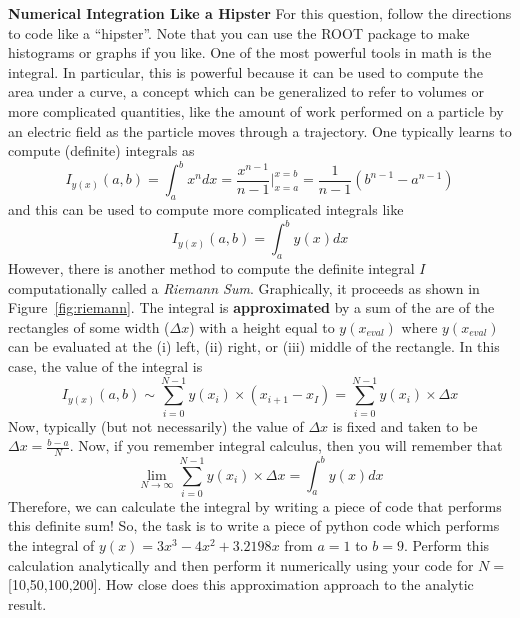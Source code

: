 \documentclass[12pt]{article}
\begin{document}
\newpage
\textbf{Numerical Integration Like a Hipster} 
\newline
For this question, follow the directions to code like a ``hipster''.  Note that you can use the ROOT package to make histograms or graphs if you like.
\newline
\newline
One of the most powerful tools in math is the integral.  In particular, this is powerful because it can be used to compute the area under a curve, a concept which can be generalized to refer to volumes or more complicated quantities, like the amount of work performed on a particle by an electric field as the particle moves through a trajectory.  One typically learns to compute (definite) integrals as
\begin{displaymath}
I_{y(x)}(a,b)=\displaystyle\int_{a}^{b} x^n dx = \frac{x^{n-1}}{n-1}|_{x=a}^{x=b} =  \frac{1}{n-1}(b^{n-1}-a^{n-1})
\end{displaymath}
and this can be used to compute more complicated integrals like
\begin{displaymath}
I_{y(x)}(a,b)=\displaystyle\int_{a}^{b} y(x) dx 
\end{displaymath}
However, there is another method to compute the definite integral $I$ computationally called a \textit{Riemann Sum}.  Graphically, it proceeds as shown in Figure~\ref{fig:riemann}.  The integral is \textbf{approximated} by a sum of the are of the rectangles of some width ($\Delta x$) with a height equal to $y(x_{eval})$ where $y(x_{eval})$ can be evaluated at the (i) left, (ii) right, or (iii) middle of the rectangle.  In this case, the value of the integral is
\begin{displaymath}
I_{y(x)}(a,b)\sim \displaystyle\sum_{i=0}^{N-1} y(x_{i})\times(x_{i+1}-x_{I})=\displaystyle\sum_{i=0}^{N-1} y(x_{i})\times\Delta x
\end{displaymath}
Now, typically (but not necessarily) the value of $\Delta x$ is fixed and taken to be $\Delta x=\frac{b-a}{N}$.  Now, if you remember integral calculus, then you will remember that
\begin{displaymath}
 \displaystyle\lim_{N\to\infty} \displaystyle\sum_{i=0}^{N-1} y(x_{i})\times\Delta x = \displaystyle\int_{a}^{b} y(x) dx 
\end{displaymath}
Therefore, we can calculate the integral by writing a piece of code that performs this definite sum!  So, the task is to write a piece of python code which performs the integral of $y(x)=3x^3-4x^2+3.2198x$ from $a=1$ to $b=9$.  Perform this calculation analytically and then perform it numerically using your code for $N=$[10,50,100,200].  How close does this approximation approach to the analytic result.
\end{document}
